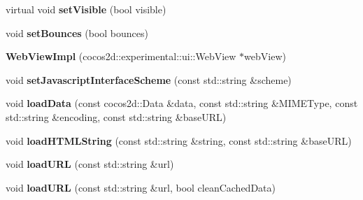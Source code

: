 \begin{DoxyCompactItemize}
\item 
\mbox{\label{classcocos2d_1_1experimental_1_1ui_1_1WebViewImpl_a004467025aeec48236038300e4e6a50c}} 
virtual void {\bfseries set\+Visible} (bool visible)
\item 
\mbox{\label{classcocos2d_1_1experimental_1_1ui_1_1WebViewImpl_aac84c819f33d1a68b0f0a81c92bc84cb}} 
void {\bfseries set\+Bounces} (bool bounces)
\item 
\mbox{\label{classcocos2d_1_1experimental_1_1ui_1_1WebViewImpl_a5318c2957d9792a0c96f1fcced986abe}} 
{\bfseries Web\+View\+Impl} (cocos2d\+::experimental\+::ui\+::\+Web\+View $\ast$web\+View)
\item 
\mbox{\label{classcocos2d_1_1experimental_1_1ui_1_1WebViewImpl_ae33ed14f18d48fa5ef67c11388b8775e}} 
void {\bfseries set\+Javascript\+Interface\+Scheme} (const std\+::string \&scheme)
\item 
\mbox{\label{classcocos2d_1_1experimental_1_1ui_1_1WebViewImpl_a1e79d5cc0fa76604e9179aebe5ae34ce}} 
void {\bfseries load\+Data} (const cocos2d\+::\+Data \&data, const std\+::string \&M\+I\+M\+E\+Type, const std\+::string \&encoding, const std\+::string \&base\+U\+RL)
\item 
\mbox{\label{classcocos2d_1_1experimental_1_1ui_1_1WebViewImpl_a5e5fc6a9e7b11bb389db088fcdc6ee97}} 
void {\bfseries load\+H\+T\+M\+L\+String} (const std\+::string \&string, const std\+::string \&base\+U\+RL)
\item 
\mbox{\label{classcocos2d_1_1experimental_1_1ui_1_1WebViewImpl_a3da06400fe3739238562f9b73f6b8b1e}} 
void {\bfseries load\+U\+RL} (const std\+::string \&url)
\item 
\mbox{\label{classcocos2d_1_1experimental_1_1ui_1_1WebViewImpl_a904c4330e4e6018099a5787c5c3cff10}} 
void {\bfseries load\+U\+RL} (const std\+::string \&url, bool clean\+Cached\+Data)

\end{DoxyCompactItemize}
